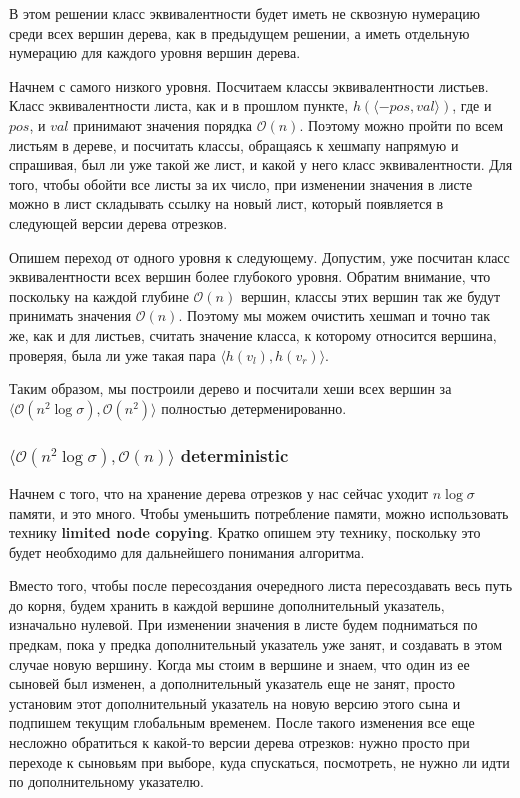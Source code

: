 В этом решении класс эквивалентности будет иметь не сквозную нумерацию среди всех вершин дерева, как в предыдущем решении, а иметь отдельную нумерацию для каждого уровня вершин дерева.

Начнем с самого низкого уровня. Посчитаем классы эквивалентности листьев. Класс эквивалентности листа, как и в прошлом пункте, $h(\langle -pos, val \rangle)$, где и $pos$, и $val$ принимают значения порядка $\mathcal{O}(n)$. Поэтому можно пройти по всем листьям в дереве, и посчитать классы, обращаясь к хешмапу напрямую и спрашивая, был ли уже такой же лист, и какой у него класс эквивалентности. Для того, чтобы обойти все листы за их число, при изменении значения в листе можно в лист складывать ссылку на новый лист, который появляется в следующей версии дерева отрезков.

Опишем переход от одного уровня к следующему. Допустим, уже посчитан класс эквивалентности всех вершин более глубокого уровня. Обратим внимание, что поскольку на каждой глубине $\mathcal{O}(n)$ вершин, классы этих вершин так же будут принимать значения $\mathcal{O}(n)$. Поэтому мы можем очистить хешмап и точно так же, как и для листьев, считать значение класса, к которому относится вершина, проверяя, была ли уже такая пара $\langle h(v_l), h(v_r) \rangle$.

Таким образом, мы построили дерево и посчитали хеши всех вершин за $\langle \mathcal{O}(n^2 \log \sigma), \mathcal{O}(n^2) \rangle$ полностью детерменированно.


\subsubsection{$\langle \mathcal{O}(n^2 \log \sigma), \mathcal{O}(n) \rangle$ deterministic}

Начнем с того, что на хранение дерева отрезков у нас сейчас уходит $n \log \sigma$ памяти, и это много. Чтобы уменьшить потребление памяти, можно использовать технику \textbf{limited node copying}. Кратко опишем эту технику, поскольку это будет необходимо для дальнейшего понимания алгоритма. 

Вместо того, чтобы после пересоздания очередного листа пересоздавать весь путь до корня, будем хранить в каждой вершине дополнительный указатель, изначально нулевой. При изменении значения в листе будем подниматься по предкам, пока у предка дополнительный указатель уже занят, и создавать в этом случае новую вершину. Когда мы стоим в вершине и знаем, что один из ее сыновей был изменен, а дополнительный указатель еще не занят, просто установим этот дополнительный указатель на новую версию этого сына и подпишем текущим глобальным временем. После такого изменения все еще несложно обратиться к какой-то версии дерева отрезков: нужно просто при переходе к сыновьям при выборе, куда спускаться, посмотреть, не нужно ли идти по дополнительному указателю.

